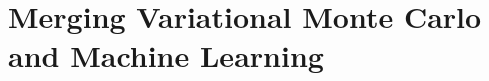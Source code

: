 \documentclass[Thesis.tex]{subfiles}
\begin{document}
\chapter{Merging Variational Monte Carlo and Machine Learning}
\end{document}
